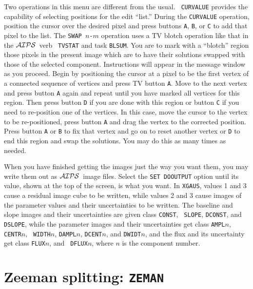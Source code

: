 \documentclass[twoside]{article}
\newcommand{\AIPS}{{$\cal AIPS\/$}}
\begin{document}
Two operations in this menu are different from the usual.  {\tt
  CURVALUE} provides the capability of selecting positions for the
edit ``list.''  During the {\tt CURVALUE} operation, position the
cursor over the desired pixel and press buttons {\tt A}, {\tt B}, or
{\tt C} to add that pixel to the list.  The {\tt SWAP $n$-$m$}
operation uses a TV blotch operation like that in the \AIPS\ verb {\tt
  TVSTAT} and task {\tt BLSUM}\@.  You are to mark with a ``blotch''
region those pixels in the present image which are to have their
solutions swapped with those of the selected component.  Instructions
will appear in the message window as you proceed.  Begin by
positioning the cursor at a pixel to be the first vertex of a
connected sequence of vertices and press TV button {\tt A}\@.  Move to
the next vertex and press button {\tt A} again and repeat until you
have marked all vertices for this region.  Then press button {\tt D}
if you are done with this region or button {\tt C} if you need to
re-position one of the vertices.  In this case, move the cursor to the
vertex to be re-positioned, press button {\tt A} and drag the vertex to
the corrected position.  Press button {\tt A} or {\tt B} to fix that
vertex and go on to reset another vertex or {\tt D} to end this region
and swap the solutions.  You may do this as many times as needed.

When you have finished getting the images just the way you want them,
you may write them out as \AIPS\ image files.  Select the {\tt SET
  DOOUTPUT} option until its value, shown at the top of the screen, is
what you want.  In {\tt XGAUS}, values 1 and 3 cause a residual image
cube to be written, while values 2 and 3 cause images of the parameter
values and their uncertainties to be written.  The baseline and slope
images and their uncertainties are given class {\tt CONST}, {\tt
  SLOPE}, {\tt DCONST}, and {\tt DSLOPE}, while the parameter images
and their uncertainties get class {\tt AMPL$n$}, {\tt CENTR$n$}, {\tt
  WIDTH$n$}, {\tt DAMPL$n$}, {\tt DCENT$n$}, and {\tt DWIDT$n$}, and
the flux and its uncertainty get class {\tt FLUX$n$}, and {\tt
  DFLUX$n$}, where $n$ is the component number.

\section{Zeeman splitting: {\tt ZEMAN}}
\end{document}
